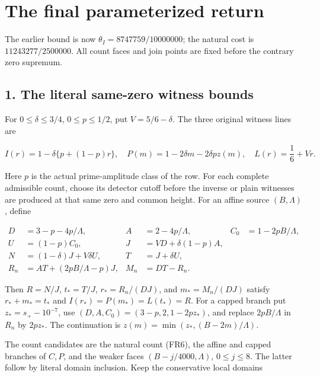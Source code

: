 \hypertarget{return:the-final-parameterized-return}{%
\section{The final parameterized return}\label{return:the-final-parameterized-return}}

The earlier bound is now \(\theta_I=8747759/10000000\); the natural cost is \(11243277/2500000\). All count faces and join points are fixed before the contrary zero supremum.

\hypertarget{return:the-literal-same-zero-witness-bounds}{%
\subsection{1. The literal same-zero witness bounds}\label{return:the-literal-same-zero-witness-bounds}}

For \(0\le\delta\le3/4\), \(0\le p\le1/2\), put \(V=5/6-\delta\). The three original witness lines are

\[
 I(r)=1-\delta\{p+(1-p)r\},\quad
 P(m)=1-2\delta m-2\delta pz(m),\quad
 L(r)=\frac16+Vr.
\tag{NR1}
\]

Here \(p\) is the actual prime-amplitude class of the row. For each complete admissible count, choose its detector cutoff before the inverse or plain witnesses are produced at that same zero and common height. For an affine source \((B,\Lambda)\), define

\[
\begin{aligned}
 D&=3-p-4p/\Lambda,& A&=2-4p/\Lambda,& C_0&=1-2pB/\Lambda,\\
 U&=(1-p)C_0,&J&=VD+\delta(1-p)A,\\
 N&=(1-\delta)J+V\delta U,&T&=J+\delta U,\\
 R_n&=AT+(2pB/\Lambda-p)J,&M_n&=DT-R_n.
\end{aligned}
\tag{NR2}
\]

Then \(R=N/J\), \(t_*=T/J\), \(r_*=R_n/(DJ)\), and \(m_*=M_n/(DJ)\) satisfy \(r_*+m_*=t_*\) and \(I(r_*)=P(m_*)=L(t_*)=R\). For a capped branch put \(z_*=s_+-10^{-7}\), use \((D,A,C_0)=(3-p,2,1-2pz_*)\), and replace \(2pB/\Lambda\) in \(R_n\) by \(2pz_*\). The continuation is \(z(m)=\min(z_*,(B-2m)/\Lambda)\).

The count candidates are the natural count (FR6), the affine and capped branches of \(C,P\), and the weaker faces \((B-j/4000,\Lambda)\), \(0\le j\le8\). The latter follow by literal domain inclusion. Keep the conservative local domains

